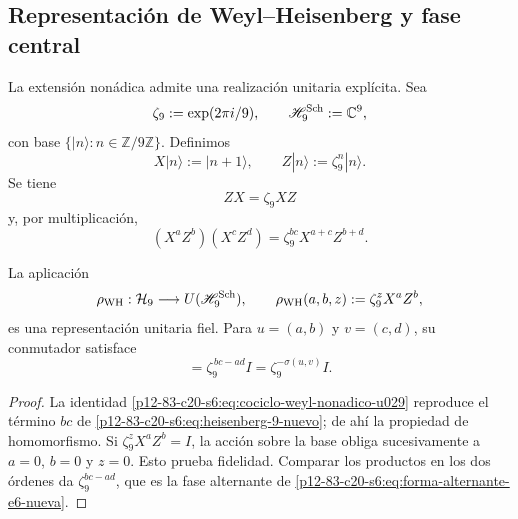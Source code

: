 \subsection{Representación de Weyl--Heisenberg y fase central}

La extensión nonádica admite una realización unitaria explícita. Sea
\[
 \zeta_9:=\exp(2\pi i/9),
 \qquad
 \mathscr H_9^{\rm Sch}:=\mathbb C^9,
\]
con base \(\{|n\rangle:n\in\mathbb Z/9\mathbb Z\}\). Definimos
\begin{equation}
 X|n\rangle:=|n+1\rangle,
 \qquad
 Z|n\rangle:=\zeta_9^n|n\rangle.
 \label{p12-83-c20-s6:eq:weyl-desplazamiento-fase-u029}
\end{equation}
Se tiene
\[
 ZX=\zeta_9XZ
\]
y, por multiplicación,
\begin{equation}
 (X^aZ^b)(X^cZ^d)
 =\zeta_9^{bc}X^{a+c}Z^{b+d}.
 \label{p12-83-c20-s6:eq:cociclo-weyl-nonadico-u029}
\end{equation}

\begin{theorem}
\label{p12-83-c20-s6:thm:representacion-weyl-heisenberg-u029}
La aplicación
\begin{equation}
 \rho_{\rm WH}:\mathcal H_9\longrightarrow
 U(\mathscr H_9^{\rm Sch}),
 \qquad
 \rho_{\rm WH}(a,b,z):=\zeta_9^zX^aZ^b,
 \label{p12-83-c20-s6:eq:representacion-weyl-heisenberg-u029}
\end{equation}
es una representación unitaria fiel. Para
\(u=(a,b)\) y \(v=(c,d)\), su conmutador satisface
\begin{equation}
 [\rho_{\rm WH}(u,0),\rho_{\rm WH}(v,0)]
 =\zeta_9^{\,bc-ad}I
 =\zeta_9^{-\sigma(u,v)}I.
 \label{p12-83-c20-s6:eq:conmutador-weyl-holonomia-u029}
\end{equation}
\end{theorem}

\begin{proof}
La identidad \eqref{p12-83-c20-s6:eq:cociclo-weyl-nonadico-u029} reproduce el término
\(bc\) de \eqref{p12-83-c20-s6:eq:heisenberg-9-nuevo}; de ahí la propiedad de
homomorfismo. Si \(\zeta_9^zX^aZ^b=I\), la acción sobre la base obliga
sucesivamente a \(a=0\), \(b=0\) y \(z=0\). Esto prueba fidelidad. Comparar
los productos en los dos órdenes da
\(\zeta_9^{bc-ad}\), que es la fase alternante de
\eqref{p12-83-c20-s6:eq:forma-alternante-e6-nueva}.
\end{proof}

